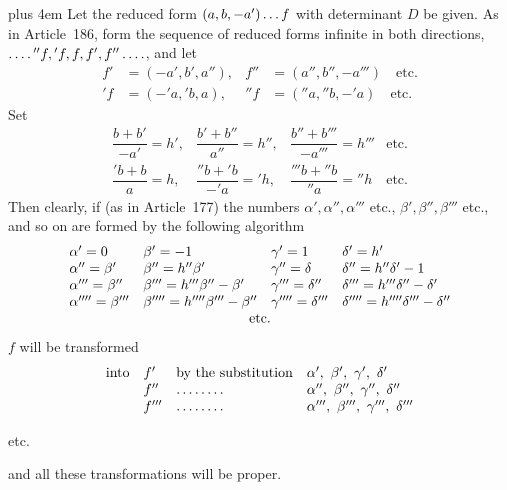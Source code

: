 {\rightskip=0pt plus 4em\relax
Let the reduced form $(a,b,-a')\mathinner{\ldotp\ldotp\ldotp} f$ with determinant $D$ be given. As in Article~186, form the sequence of reduced forms infinite in both directions, $\mathinner{\ldotp\ldotp\ldotp\ldotp} {}''f,{}'f,f,f',f''\mathinner{\ldotp\ldotp\ldotp\ldotp}$, and let
\[
\begin{aligned}
f'&=(-a',b',a''),& f''&=(a'',b'',-a''')\quad\text{etc.}\\
{}'f&=(-{}'a,{}'b,a),& {}''f&=({}''a,{}''b,-{}'a)\quad\text{etc.}
\end{aligned}
\]
Set
\[
\begin{array}{llll}
\dfrac{b+b'}{-a'}=h',&\dfrac{b'+b''}{a''}=h'',&\dfrac{b''+b'''}{-a'''}=h'''&\text{etc.}\\[6pt]
\dfrac{{}'b+b}{a}=h,&\dfrac{{}''b+{}'b}{-{}'a}={}'h,&\dfrac{{}'''b+{}''b}{{}''a}={}''h&\text{etc.}
\end{array}
\]
Then clearly, if (as in Article~177) the numbers $\alpha',\alpha'',\alpha'''$ etc., $\beta',\beta'',\beta'''$ etc., and so on are formed by the following algorithm
{\small
\setlength{\arraycolsep}{3pt}
\[
\begin{array}{llll}
\alpha'=0&\beta'=-1&\gamma'=1&\delta'=h'\\
\alpha''=\beta'&\beta''=h''\beta'&\gamma''=\delta&\delta''=h''\delta'-1\\
\alpha'''=\beta''&\beta'''=h'''\beta''-\beta'&\gamma'''=\delta''&\delta'''=h'''\delta''-\delta'\\
\alpha''''=\beta'''&\beta''''=h''''\beta'''-\beta''&\gamma''''=\delta'''&\delta''''=h''''\delta'''-\delta''
\\
\multicolumn{4}{c}{\text{etc.}}
\end{array}
\]
}
$f$ will be transformed
\[
\begin{array}{@{}rlll@{}}
\text{into}&f'&\text{by the substitution}&\alpha',\ \beta',\ \gamma',\ \delta'\\
&f''&\mathinner{\ldotp\ldotp\ldotp\ldotp\ldotp\ldotp\ldotp\ldotp}&\alpha'',\ \beta'',\ \gamma'',\ \delta''\\
&f'''&\mathinner{\ldotp\ldotp\ldotp\ldotp\ldotp\ldotp\ldotp\ldotp}&\alpha''',\ \beta''',\ \gamma''',\ \delta'''
\end{array}
\]
\centerline{etc.}
and all these transformations will be proper.\par}

